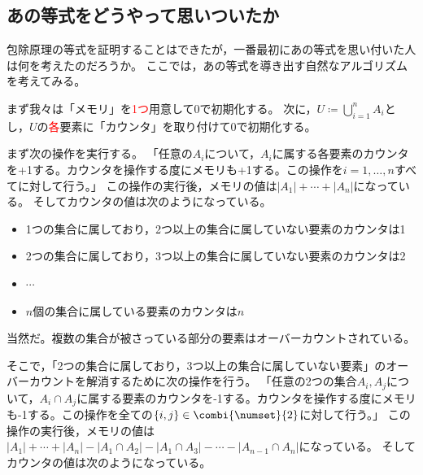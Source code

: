            \subsection{あの等式をどうやって思いついたか}
                包除原理の等式を証明することはできたが，一番最初にあの等式を思い付いた人は何を考えたのだろうか。
                ここでは，あの等式を導き出す自然なアルゴリズムを考えてみる。
                \par
                まず我々は「メモリ」を\textcolor{red}{1つ}用意して0で初期化する。
                次に，$U\coloneq\bigcup_{i=1}^n A_i$とし，$U$の\textcolor{red}{各}要素に「カウンタ」を取り付けて0で初期化する。
                \par
                まず次の操作を実行する。
                「任意の$A_i$について，$A_i$に属する各要素のカウンタを+1する。カウンタを操作する度にメモリも+1する。この操作を$i=1,\dotsc,n$すべてに対して行う。」
                この操作の実行後，メモリの値は$|A_1|+\dotsb +|A_n|$になっている。
                そしてカウンタの値は次のようになっている。
                \begin{itemize}
                    \item 1つの集合に属しており，2つ以上の集合に属していない要素のカウンタは1
                    \item 2つの集合に属しており，3つ以上の集合に属していない要素のカウンタは2
                    \item $\cdots$
                    \item $n$個の集合に属している要素のカウンタは$n$
                \end{itemize}
                当然だ。複数の集合が被さっている部分の要素はオーバーカウントされている。
                \par
                そこで，「2つの集合に属しており，3つ以上の集合に属していない要素」のオーバーカウントを解消するために次の操作を行う。
                「任意の2つの集合$A_i,A_j$について，$A_i\cap A_j$に属する要素のカウンタを-1する。カウンタを操作する度にメモリも-1する。この操作を全ての$\{i,j\}\in\combi{\numset}{2}$に対して行う。」
                この操作の実行後，メモリの値は$|A_1|+\dotsb +|A_n| - |A_1\cap A_2| - |A_1\cap A_3| - \dotsb - |A_{n-1}\cap A_n|$になっている。
                そしてカウンタの値は次のようになっている。
